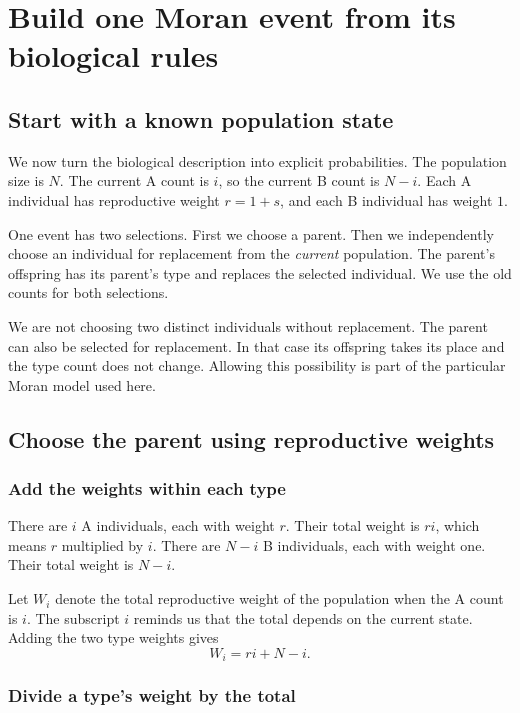 \chapter{Build one Moran event from its biological rules}
\label{chap:moran-event}

\section{Start with a known population state}

We now turn the biological description into explicit probabilities. The
population size is \(N\). The current A count is \(i\), so the current B
count is \(N-i\). Each A individual has reproductive weight \(r=1+s\),
and each B individual has weight \(1\).

One event has two selections. First we choose a parent. Then we independently
choose an individual for replacement from the \emph{current} population.
The parent's offspring has its parent's type and replaces the selected
individual. We use the old counts for both selections.

We are not choosing two distinct individuals without replacement. The parent
can also be selected for replacement. In that case its offspring takes its
place and the type count does not change. Allowing this possibility is part
of the particular Moran model used here.

\section{Choose the parent using reproductive weights}

\subsection{Add the weights within each type}

There are \(i\) A individuals, each with weight \(r\). Their total weight
is \(ri\), which means \(r\) multiplied by \(i\). There are \(N-i\)
B individuals, each with weight one. Their total weight is \(N-i\).

Let \(W_i\) denote the total reproductive weight of the population when
the A count is \(i\). The subscript \(i\) reminds us that the total depends
on the current state. Adding the two type weights gives
\[
  W_i=ri+N-i.
\]

\subsection{Divide a type's weight by the total}

